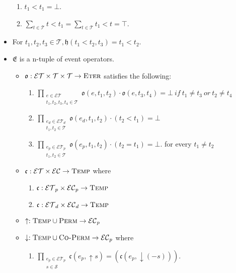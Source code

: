 \begin{itemize}
\begin{enumerate}
		      \item $t_1 < t_1 = \bot$.
		      \item $\sum_{t \in \mathcal{T}} t < t_1 = \sum_{t \in \mathcal{T}} t_1 < t = \top$.
	      \end{enumerate}
	\item For $t_1, t_2, t_3 \in \mathcal{T}, \mathfrak{h}(t_1 < t_2, t_3) = t_1 < t_2$.
	\item $\mathfrak{E}$ is a n-tuple of event operators.
	      \begin{itemize}
		      \item $\mathfrak{o} : \mathcal{ET} \times \mathcal{T} \times \mathcal{T} \to \textsc{Eter}$ satisfies the following:
		            \begin{enumerate}
			            \item $\displaystyle \prod_{\substack{e \in \mathcal{ET} \\ t_1, t_2, t_3, t_4 \in \mathcal{T}}} \mathfrak{o}(e, t_1, t_2) \cdot \mathfrak{o}(e, t_3, t_4) = \bot  \ if \ t_1 \neq t_3 \ or \  t_2 \neq t_4$
			            \item $\displaystyle\prod_{\substack{e_d \in \mathcal{ET}_d \\ t_1, t_2 \in \mathcal{T}}} \mathfrak{o}(e_d, t_1, t_2) \cdot (t_2 < t_1) = \bot$
			            \item $\displaystyle\prod_{\substack{e_p \in \mathcal{ET}_p \\ t_1, t_2 \in \mathcal{T}}} \mathfrak{o}(e_p, t_1, t_2) \cdot (t_2 = t_1) = \bot$. for every $t_1 \neq t_2$
		            \end{enumerate}
		            \item$\mathfrak{c} : \mathcal{ET} \times \mathcal{EC}\to \textsc{Temp}$ where
		            \begin{enumerate}
			            \item $\mathfrak{c} : \mathcal{ET}_p \times \mathcal{EC}_p \to \textsc{Temp}$
			            \item $\mathfrak{c} : \mathcal{ET}_d \times \mathcal{EC}_d \to \textsc{Temp}$
		            \end{enumerate}
		      \item $\uparrow :  \textsc{Temp} \cup \textsc{Perm} \to \mathcal{EC}_p$
		      \item $\downarrow :  \textsc{Temp} \cup \textsc{Co-Perm} \to \mathcal{EC}_p$ where
		            \begin{enumerate}
			            \item $\displaystyle\prod_{\substack{e_p \in \mathcal{ET}_p \\ s \in \mathcal{S}}} \mathfrak{c}(e_p, \uparrow s) = (\mathfrak{c}(e_p, \downarrow(- s)))$.

\end{enumerate}
\end{itemize}
\end{itemize}
